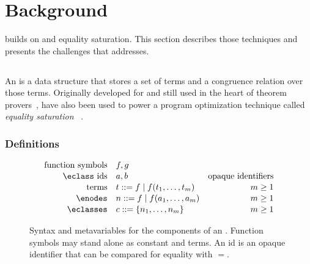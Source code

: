 \section{Background}
\label{sec:background}

\egg builds on \egraphs and equality saturation.
  This section describes those techniques and
  presents the challenges that \egg addresses.



\subsection{\Egraphs}
\label{sec:egraphs}

An \textit{\egraph} is a data structure that stores a set of terms and a
  congruence relation over those terms.
Originally developed for and still used in the
  heart of theorem provers~\cite{nelson, simplify, z3},
  \egraphs have also been used to power a program optimization technique
  called \textit{equality saturation}~%
  \cite{denali, eqsat, eqsat-llvm, szalinski, yogo-pldi20, spores, herbie}.

\subsubsection{Definitions}

\begin{figure}
  \centering
  \begin{align*}
     \text{function symbols} \quad & f,g                                   \\[-0.2em]
     \text{\eclass ids} \quad & a,b & \text{opaque identifiers}            \\[-0.2em]
     \text{terms}     \quad & t  ::= f \mid f(t_1, \ldots, t_m) & m \geq 1 \\[-0.2em]
     \text{\enodes}   \quad & n  ::= f \mid f(a_1, \ldots, a_m) & m \geq 1 \\[-0.2em]
     \text{\eclasses} \quad & c  ::= \{ n_1, \ldots, n_m \}     & m \geq 1
  \end{align*}
  \caption{
    Syntax and metavariables for the components of an \egraph.
    Function symbols may stand alone as constant \enodes and terms.
    An \eclass id is an opaque identifier that can be compared for equality with $=$.
  }
  \label{fig:syntax}
\end{figure}

